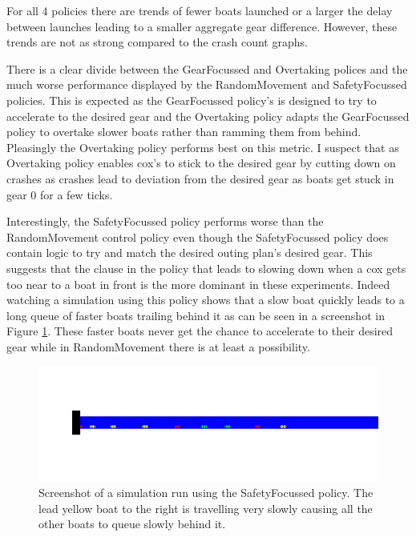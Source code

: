 For all 4 policies there are trends of fewer boats launched or a larger the delay between launches leading to a smaller aggregate gear difference. However, these trends are not as strong compared to the crash count graphs.

There is a clear divide between the GearFocussed and Overtaking polices and the much worse performance displayed by the RandomMovement and SafetyFocussed policies. This is expected as the GearFocussed policy's is designed to try to accelerate to the desired gear and the Overtaking policy adapts the GearFocussed policy to overtake slower boats rather than ramming them from behind. Pleasingly the Overtaking policy performs best on this metric. I suspect that as Overtaking policy enables cox's to stick to the desired gear by cutting down on crashes as crashes lead to deviation from the desired gear as boats get stuck in gear 0 for a few ticks.

Interestingly, the SafetyFocussed policy performs worse than the RandomMovement control policy even though the SafetyFocussed policy does contain logic to try and match the desired outing plan's desired gear. This suggests that the clause in the policy that leads to slowing down when a cox gets too near to a boat in front is the more dominant in these experiments. Indeed watching a simulation using this policy shows that a slow boat quickly leads to a long queue of faster boats trailing behind it as can be seen in a screenshot in Figure \ref{experiments:safety_queue_screenshot}. These faster boats never get the chance to accelerate to their desired gear while in RandomMovement there is at least a possibility.

\begin{figure}
\begin{center}
  \includegraphics[scale=0.5]{images/SafetyFocussedQueue.png}
  \caption{Screenshot of a simulation run using the SafetyFocussed policy. The lead yellow boat to the right is travelling very slowly causing all the other boats to queue slowly behind it.}
  \label{experiments:safety_queue_screenshot}
\end{center}
\end{figure}

